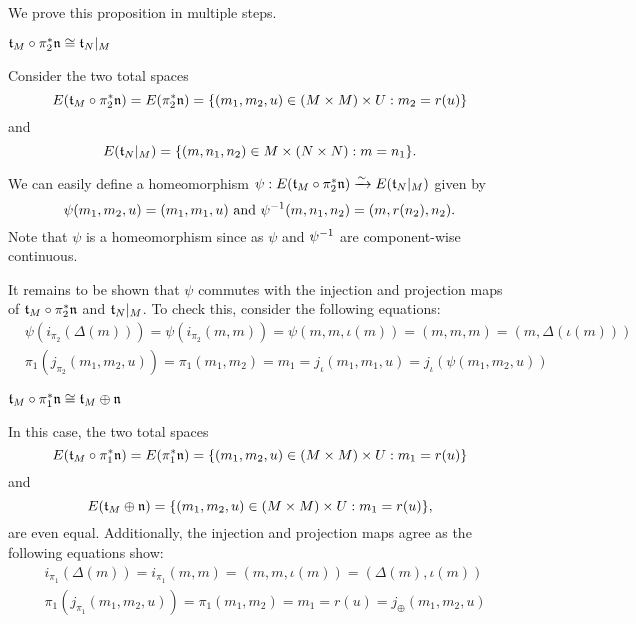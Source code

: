 \begin{myproof}
    We prove this proposition in multiple steps.
    \begin{steps}
        \item $\mathfrak{t}_M \circ \pi_2^*\mathfrak{n} \cong \mathfrak{t}_N\vert_{M}$
        
        Consider the two total spaces
        \[ E(\mathfrak{t}_M \circ \pi_2^*\mathfrak{n}) = E(\pi_2^*\mathfrak{n}) = \{(m_1, m_2, u) \in (M \times M) \times U:m_2 = r(u)\} \]
        and
        \[ E(\mathfrak{t}_N\vert_{M}) = \{(m, n_1, n_2) \in M \times (N \times N):m = n_1\}. \]

        We can easily define a homeomorphism $\psi: E(\mathfrak{t}_M \circ \pi_2^*\mathfrak{n}) \xrightarrow{\sim} E(\mathfrak{t}_N\vert_{M})$ given by
        \[ \psi(m_1, m_2, u) = (m_1, m_1, u) \text{ and } \psi^{-1}(m, n_1, n_2) = (m, r(n_2), n_2). \]
        Note that $\psi$ is a homeomorphism since as $\psi$ and $\psi^{-1}$ are component-wise continuous.

        It remains to be shown that $\psi$
        commutes with the injection and projection maps of $\mathfrak{t}_M \circ \pi_2^*\mathfrak{n}$ and $\mathfrak{t}_N\vert_{M}$.
        To check this, consider the following equations:
        \begin{align}
            & \psi(i_{\pi_2}(\Delta(m))) = \psi(i_{\pi_2}(m, m)) = \psi(m, m, \iota(m)) = (m, m, m) = (m, \Delta(\iota(m))) \\
            & \pi_1(j_{\pi_2}(m_1, m_2, u)) = \pi_1(m_1, m_2) = m_1 = j_\iota(m_1, m_1, u) = j_\iota(\psi(m_1, m_2, u)) 
        \end{align}
        
        \item $\mathfrak{t}_M \circ \pi_1^*\mathfrak{n} \cong \mathfrak{t}_M \oplus{} \mathfrak{n}$
        
        In this case, the two total spaces
        \[ E(\mathfrak{t}_M \circ \pi_1^*\mathfrak{n}) = E(\pi_1^*\mathfrak{n}) = \{(m_1, m_2, u) \in (M \times M) \times U:m_1 = r(u)\} \]
        and
        \[ E(\mathfrak{t}_M \oplus{} \mathfrak{n}) = \{(m_1, m_2, u) \in (M \times M) \times U:m_1 = r(u)\}, \]
        are even equal.
        Additionally, the injection and projection maps agree as the following equations show:
        \begin{align}
            & i_{\pi_1}(\Delta(m)) = i_{\pi_1}(m, m) = (m, m, \iota(m)) = (\Delta(m), \iota(m)) \\
            & \pi_1(j_{\pi_1}(m_1, m_2, u)) = \pi_1(m_1, m_2) = m_1 = r(u) = j_{\oplus}(m_1, m_2, u)
        \end{align}


\end{steps}
\end{myproof}
